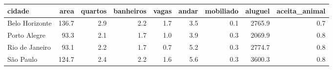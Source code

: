
\begin{tabular}{l|r|r|r|r|r|r|r|r}
\hline
cidade & area & quartos & banheiros & vagas & andar & mobiliado & aluguel & aceita\_animal\\
\hline
Belo Horizonte & 136.7 & 2.9 & 2.2 & 1.7 & 3.5 & 0.1 & 2765.9 & 0.7\\
\hline
Porto Alegre & 93.3 & 2.1 & 1.7 & 1.0 & 3.9 & 0.3 & 2069.9 & 0.8\\
\hline
Rio de Janeiro & 93.1 & 2.2 & 1.7 & 0.7 & 5.2 & 0.3 & 2774.7 & 0.8\\
\hline
São Paulo & 124.7 & 2.4 & 2.2 & 1.6 & 5.6 & 0.3 & 3600.3 & 0.8\\
\hline
\end{tabular}
